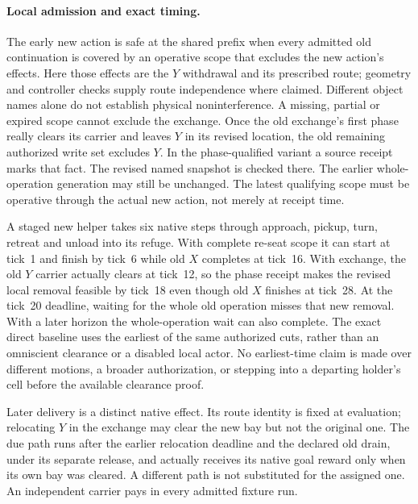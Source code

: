\documentclass[11pt]{article}
\begin{document}
\paragraph{Local admission and exact timing.}
The early new action is safe at the shared prefix when every
admitted old continuation is covered by an operative scope
that excludes the new action's effects. Here those effects
are the $Y$ withdrawal and its prescribed route; geometry and
controller checks supply route independence where claimed.
Different object names alone do not establish physical
noninterference. A missing, partial or expired scope cannot
exclude the exchange. Once the old exchange's first phase
really clears its carrier and leaves $Y$ in its revised
location, the old remaining authorized write set excludes
$Y$. In the phase-qualified variant a source receipt marks
that fact. The revised named snapshot is checked there.
The earlier whole-operation generation may still be unchanged.
The latest qualifying scope must be operative through the actual
new action, not merely at receipt time.

A staged new helper takes six native steps through approach,
pickup, turn, retreat and unload into its refuge. With complete
re-seat scope it can start at tick~1 and finish by tick~6 while
old $X$ completes at tick~16. With exchange, the old $Y$
carrier actually clears at tick~12, so the phase receipt
makes the revised local removal feasible by tick~18 even though
old $X$ finishes at tick~28. At the tick~20 deadline, waiting
for the whole old operation misses that new removal. With
a later horizon the whole-operation wait can also complete.
The exact direct baseline uses the earliest of the same
authorized cuts, rather than an omniscient clearance or
a disabled local actor. No earliest-time claim is made over
different motions, a broader authorization, or stepping into
a departing holder's cell before the available clearance proof.

Later delivery is a distinct native effect. Its route identity
is fixed at evaluation; relocating $Y$ in the exchange may
clear the new bay but not the original one. The due path
runs after the earlier relocation deadline and the declared
old drain, under its separate release, and actually receives
its native goal reward only when its own bay was cleared.
A different path is not substituted for the assigned one.
An independent carrier pays in every admitted fixture run.
\end{document}
